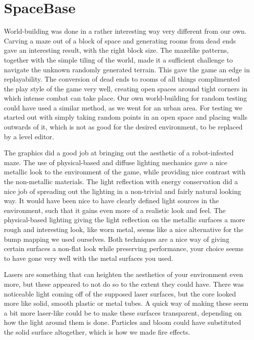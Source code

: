 \section{SpaceBase}
World-building was done in a rather interesting way very different from our own. Carving a maze out of a block of space and generating rooms from dead ends gave an interesting result, with the right block size. The mazelike patterns, together with the simple tiling of the world, made it a sufficient challenge to navigate the unknown randomly generated terrain. This gave the game an edge in replayability. The conversion of dead ends to rooms of all things complimented the play style of the game very well, creating open spaces around tight corners in which intense combat can take place. Our own world-building for random testing could have used a similar method, as we went for an urban area. For testing we started out with simply taking random points in an open space and placing walls outwards of it, which is not as good for the desired environment, to be replaced by a level editor.

The graphics did a good job at bringing out the aesthetic of a robot-infested maze. The use of physical-based and diffuse lighting mechanics gave a nice metallic look to the environment of the game, while providing nice contrast with the non-metallic materials. The light reflection with energy conservation did a nice job of spreading out the lighting in a non-trivial and fairly natural looking way. It would have been nice to have clearly defined light sources in the environment, such that it gains even more of a realistic look and feel. The physical-based lighting giving the light reflection on the metallic surfaces a more rough and interesting look, like worn metal, seems like a nice alternative for the bump mapping we used ourselves. Both techniques are a nice way of giving certain surfaces a non-flat look while preserving performance, your choice seems to have gone very well with the metal surfaces you used.

Lasers are something that can heighten the aesthetics of your environment even more, but these appeared to not do so to the extent they could have. There was noticeable light coming off of the supposed laser surfaces, but the core looked more like solid, smooth plastic or metal tubes. A quick way of making these seem a bit more laser-like could be to make these surfaces transparent, depending on how the light around them is done. Particles and bloom could have substituted the solid surface altogether, which is how we made fire effects.

